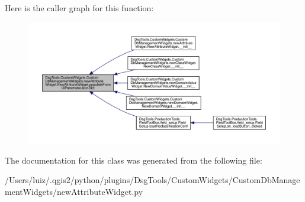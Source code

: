 Here is the caller graph for this function\+:
\nopagebreak
\begin{figure}[H]
\begin{center}
\leavevmode
\includegraphics[width=350pt]{class_dsg_tools_1_1_custom_widgets_1_1_custom_db_management_widgets_1_1new_attribute_widget_1_1_new_attribute_widget_a5e18f5473b9c2210a03b1b9afc55fb03_icgraph}
\end{center}
\end{figure}


The documentation for this class was generated from the following file\+:\begin{DoxyCompactItemize}
\item 
/\+Users/luiz/.\+qgis2/python/plugins/\+Dsg\+Tools/\+Custom\+Widgets/\+Custom\+Db\+Management\+Widgets/new\+Attribute\+Widget.\+py\end{DoxyCompactItemize}

